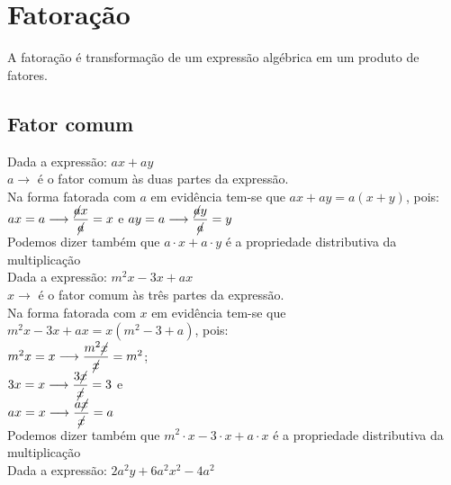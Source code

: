 \section{Fatoração}
A fatoração é transformação de um expressão algébrica em um produto de fatores.\\

\subsection{Fator comum}

Dada a expressão: $ ax + ay $ \\

$ a \longrightarrow $  é o fator comum às duas partes da expressão.\\

Na forma fatorada com $ a $ em evidência tem-se que $ ax + ay = a(x+y)$, pois:\\

$ ax = a \longrightarrow \dfrac{\cancel{a}x}{\cancel{a}} = x $ e $ ay = a \longrightarrow  \dfrac{\cancel{a}y}{\cancel{a}} = y $ \\

Podemos dizer também que $ a \cdot x + a \cdot y $ é a propriedade distributiva da multiplicação\\

Dada a expressão: $ m^{2}x - 3x + ax $\\

$ x \longrightarrow $  é o fator comum às três partes da expressão.\\

Na forma fatorada com $ x $ em evidência tem-se que $ m^{2}x - 3x + ax = x(m^{2} - 3 + a) $, pois:\\

$ m^{2}x = x \longrightarrow \dfrac{m^{2}\cancel{x}}{\cancel{x}} = m^{2} $; \\
 
$ 3x = x \longrightarrow  \dfrac{3\cancel{x}}{\cancel{x}} = 3 $ e \\

$  ax = x \longrightarrow  \dfrac{a\cancel{x}}{\cancel{x}} = a $ \\

Podemos dizer também que $ m^{2} \cdot x - 3 \cdot x + a \cdot x $ é a propriedade distributiva da multiplicação \\

Dada a expressão: $ 2a^{2}y + 6a^{2}x^{2} - 4a^{2} $\\

